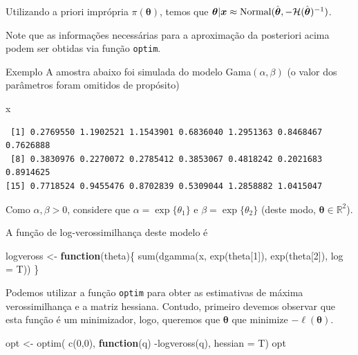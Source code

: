 \documentclass[
  letterpaper,
  DIV=11,
  numbers=noendperiod]{scrreprt}
\newenvironment{Shaded}{\begin{snugshade}}{\end{snugshade}}
\newcommand{\AttributeTok}[1]{\textcolor[rgb]{0.40,0.45,0.13}{#1}}
\newcommand{\ControlFlowTok}[1]{\textcolor[rgb]{0.00,0.23,0.31}{\textbf{#1}}}
\newcommand{\DecValTok}[1]{\textcolor[rgb]{0.68,0.00,0.00}{#1}}
\newcommand{\FunctionTok}[1]{\textcolor[rgb]{0.28,0.35,0.67}{#1}}
\newcommand{\NormalTok}[1]{\textcolor[rgb]{0.00,0.23,0.31}{#1}}
\newcommand{\OtherTok}[1]{\textcolor[rgb]{0.00,0.23,0.31}{#1}}
\newcommand{\SpecialCharTok}[1]{\textcolor[rgb]{0.37,0.37,0.37}{#1}}
\theoremstyle{plain}
\theoremstyle{definition}
\theoremstyle{definition}
\theoremstyle{remark}
\begin{document}
Utilizando a priori imprópria \(\pi(\boldsymbol{\theta})\), temos que
\(\boldsymbol{\theta}|\boldsymbol{x}\approx \hbox{Normal}(\hat{\boldsymbol{\theta}},-\mathcal{H}(\hat{\boldsymbol{\theta}})^{-1})\).

Note que as informações necessárias para a aproximação da posteriori
acima podem ser obtidas via função \texttt{optim}.

Exemplo A amostra abaixo foi simulada do modelo Gama\((\alpha,\beta)\)
(o valor dos parâmetros foram omitidos de propósito)

\begin{Shaded}
\begin{Highlighting}[]
\NormalTok{x}
\end{Highlighting}
\end{Shaded}

\begin{verbatim}
 [1] 0.2769550 1.1902521 1.1543901 0.6836040 1.2951363 0.8468467 0.7626888
 [8] 0.3830976 0.2270072 0.2785412 0.3853067 0.4818242 0.2021683 0.8914625
[15] 0.7718524 0.9455476 0.8702839 0.5309044 1.2858882 1.0415047
\end{verbatim}

Como \(\alpha,\beta>0\), considere que \(\alpha=\exp\{\theta_1\}\) e
\(\beta=\exp\{\theta_2\}\) (deste modo,
\(\boldsymbol{\theta}\in\mathbb{R}^2\)).

A função de log-verossimilhança deste modelo é

\begin{Shaded}
\begin{Highlighting}[]
\NormalTok{logveross }\OtherTok{\textless{}{-}} \ControlFlowTok{function}\NormalTok{(theta)\{ }\FunctionTok{sum}\NormalTok{(}\FunctionTok{dgamma}\NormalTok{(x, }\FunctionTok{exp}\NormalTok{(theta[}\DecValTok{1}\NormalTok{]), }\FunctionTok{exp}\NormalTok{(theta[}\DecValTok{2}\NormalTok{]), }\AttributeTok{log =}\NormalTok{ T))}
\NormalTok{\}}
\end{Highlighting}
\end{Shaded}

Podemos utilizar a função \texttt{optim} para obter as estimativas de
máxima verossimilhança e a matriz hessiana. Contudo, primeiro devemos
observar que esta função é um minimizador, logo, queremos que
\(\boldsymbol{\theta}\) que minimize \(-\ell({\boldsymbol{\theta}})\).

\begin{Shaded}
\begin{Highlighting}[]
\NormalTok{opt }\OtherTok{\textless{}{-}} \FunctionTok{optim}\NormalTok{( }\FunctionTok{c}\NormalTok{(}\DecValTok{0}\NormalTok{,}\DecValTok{0}\NormalTok{), }\ControlFlowTok{function}\NormalTok{(q) }\SpecialCharTok{{-}}\FunctionTok{logveross}\NormalTok{(q), }\AttributeTok{hessian =}\NormalTok{ T)}
\NormalTok{opt}
\end{Highlighting}
\end{Shaded}
\end{document}
